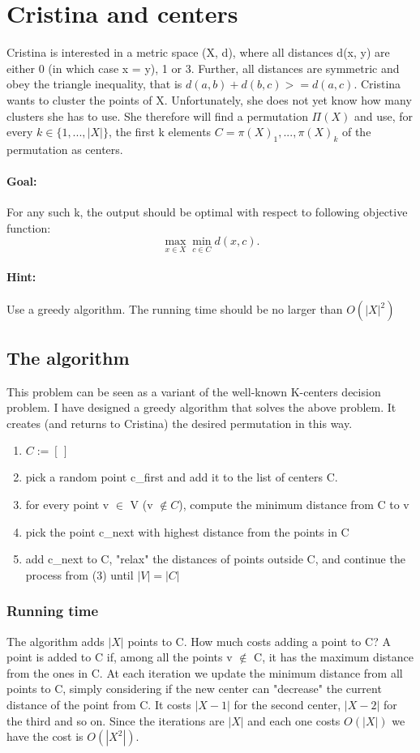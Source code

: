 \section{Cristina and centers}
Cristina is interested in a metric space (X, d), where all distances d(x, y) are
either 0 (in which case x = y), 1 or 3. Further, all distances are symmetric and obey the triangle inequality, that is $d(a, b) + d(b, c) >= d(a, c)$. Cristina wants to cluster the points of X. Unfortunately, she does not yet know how many clusters she has to use. She therefore will find a permutation $\Pi(X)$ and use, for every $k \in \{1, ..., |X|\}$, the first k elements $C =
{\pi(X)_1, ..., \pi(X)_k}$ of the permutation as centers.
\paragraph*{Goal:} For any such k, the output should be optimal with respect to following objective function:
\begin{equation}
\max_{x \in X} \min_{c \in C} d(x,c).
\end{equation}
\paragraph*{Hint:} Use a greedy algorithm. The running time should be no larger than $O(|X|^2)$

\subsection{The algorithm}
This problem can be seen as a variant of the well-known K-centers decision problem. I have designed a greedy algorithm that solves the above problem.
It creates (and returns to Cristina) the desired permutation in this way.
\begin{enumerate}
	\item $C:= [\,]$
	\item pick a random point c\_first and add it to the list of centers C.
	\item for every point v $\in$ V (v $\notin C$), compute the minimum distance from C to v 
	\item pick the point c\_next with highest distance from the points in C
	\item add c\_next to C, "relax" the distances of points outside C, and continue the process from (3) until $|V| = |C|$
\end{enumerate}

\subsubsection{Running time}
The algorithm adds $|X|$ points to C. How much costs adding a point to C? A point is added to C if, among all the points v $\notin$ C, it has the maximum distance from the ones in C. At each iteration we update the minimum distance from all points to C, simply considering if the new center can "decrease" the current distance of the point from C. It costs $|X - 1|$ for the second center, $|X - 2|$ for the third and so on. Since the iterations are $|X|$ and each one costs $O(|X|)$ we have the cost is $O(|X^2|)$.
